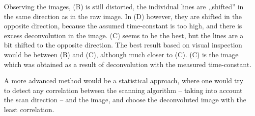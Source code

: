 Observing the images, (B) is still distorted, the individual lines are ,,shifted'' in the same direction as in the raw image.
In (D) however, they are shifted in the opposite direction, because the assumed time-constant is too high, and there is excess deconvolution in the image.
(C) seems to be the best, but the lines are a bit shifted to the opposite direction.
The best result based on visual inspection would be between (B) and (C), although much closer to (C).
(C) is the image which was obtained as a result of deconvolution with the measured time-constant.

A more advanced method would be a statistical approach, where one would try to detect any correlation between the scanning algorithm -- taking into account the scan direction -- and the image, and choose the deconvoluted image with the least correlation.
